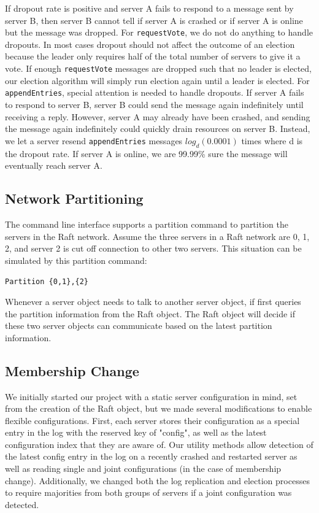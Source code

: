 \documentclass[letterpaper,twocolumn,10pt]{article}
\begin{document}
If dropout rate is positive and server A fails to respond to a message sent by server B, then server B cannot tell if server A is crashed or if server A is online but the message was dropped. For \texttt{requestVote}, we do not do anything to handle dropouts. In most cases dropout should not affect the outcome of an election because the leader only requires half of the total number of servers to give it a vote. If enough \texttt{requestVote} messages are dropped such that no leader is elected, our election algorithm will simply run election again until a leader is elected. For \texttt{appendEntries}, special attention is needed to handle dropouts. If server A fails to respond to server B, server B could send the message again indefinitely until receiving a reply. However, server A may already have been crashed, and sending the message again indefinitely could quickly drain resources on server B. Instead, we let a server resend \texttt{appendEntries} messages $log_d(0.0001)$ times where d is the dropout rate. If server A is online, we are 99.99\% sure the message will eventually reach server A.

\subsection{Network Partitioning}
The command line interface supports a partition command to partition the servers in the Raft network. Assume the three servers in a Raft network are 0, 1, 2, and server 2 is cut off connection to other two servers. This situation can be simulated by this partition command:

\texttt{Partition \{0,1\},\{2\}}

Whenever a server object needs to talk to another server object, if first queries the partition information from the Raft object. The Raft object will decide if these two server objects can communicate based on the latest partition information.

\subsection{Membership Change}
We initially started our project with a static server configuration in mind, set from the creation of the Raft object, but we made several modifications to enable flexible configurations. First, each server stores their configuration as a special entry in the log with the reserved key of "config", as well as the latest configuration index that they are aware of. Our utility methods allow detection of the latest config entry in the log on a recently crashed and restarted server as well as reading single and joint configurations (in the case of membership change). Additionally, we changed both the log replication and election processes to require majorities from both groups of servers if a joint configuration was detected.
\end{document}

